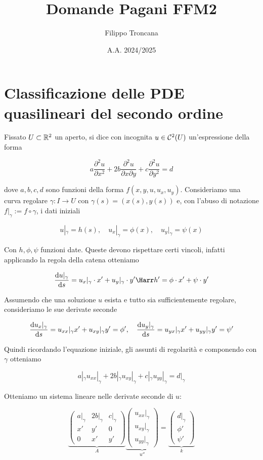 \documentclass{article}
\title{Domande Pagani FFM2}
\author{Filippo Troncana}
\date{A.A. 2024/2025}
\renewcommand\C{\mc{C}}
\newcommand\del{\partial}
\begin{document}
\maketitle

\section{Classificazione delle PDE quasilineari del secondo ordine}

Fissato $U \subset \mathbb{R}^2$ un aperto, si dice  con incognita $u \in \C^2(U)$ un'espressione della forma 

\[ a\frac{\del^2 u}{\del x^2} + 2b\frac{\del^2 u}{\del x\del y} + c\frac{\del^2 u}{\del y^2} = d\]

dove $a,b,c,d$ sono funzioni della forma $f(x,y,u,u_x,u_y)$. Consideriamo una curva regolare $\gamma : I \to U$ con $\gamma(s) = (x(s), y(s))$ e, con l'abuso di notazione $f|_\gamma := f \circ \gamma$, i dati iniziali 

\[ u|_\gamma = h(s), \quad u_x|_\gamma  = \phi(x), \quad u_y|_\gamma = \psi(x)\]

Con $h,\phi,\psi$ funzioni date. Queste devono rispettare certi vincoli, infatti applicando la regola della catena otteniamo

\[ \frac{\di u|_\gamma}{\di s}= u_x|_\gamma \cdot x'+ u_y|_\gamma \cdot y' \Harr h' = \phi\cdot x' + \psi\cdot y' \]

Assumendo che una soluzione $u$ esista e tutto sia sufficientemente regolare, consideriamo le sue derivate seconde

\[ \frac{\text{d} u_x|_\gamma}{\text{d} s} = u_{xx}|_\gamma x' + u_{xy}|_\gamma y'=\phi',\quad \frac{\text{d} u_y|_\gamma}{\text{d} s} = u_{yx}|_\gamma x' + u_{yy}|_\gamma y'=\psi'\]

Quindi ricordando l'equazione iniziale, gli assunti di regolarità e componendo con $\gamma$ otteniamo

\[ a|_\gamma u_{xx}|_\gamma + 2b|_\gamma u_{xy}|_\gamma + c|_\gamma u_{yy}|_\gamma = d|_\gamma\]

Otteniamo un sistema lineare nelle derivate seconde di $u$:

\[\underbrace{\begin{pmatrix} a|_\gamma & 2b|_\gamma & c|_\gamma \\ x' & y' & 0 \\ 0 & x' & y' \end{pmatrix}}_{A} \underbrace{\begin{pmatrix} u_{xx}|_\gamma \\ u_{xy}|_\gamma \\ u_{yy}|_\gamma \end{pmatrix}}_{u''} = \underbrace{\begin{pmatrix} d|_\gamma \\ \phi' \\ \psi' \end{pmatrix}}_{k} \]
\end{document}
